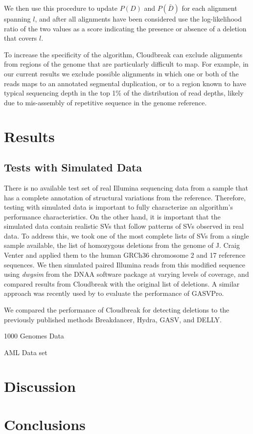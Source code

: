 \documentclass[12pt]{article}
\begin{document}
We then use this procedure to update $P(D)$ and $P(\bar{D})$ for each alignment spanning $l$, and after all alignments have been considered use the log-likelihood ratio of the two values as a score indicating the presence or absence of a deletion that covers $l$.

To increase the specificity of the algorithm, Cloudbreak can exclude alignments from regions of the genome that are particularly difficult to map. For example, in our current results we exclude possible alignments in which one or both of the reads maps to an annotated segmental duplication, or to a region known to have typical sequencing depth in the top 1\% of the distribution of read depths, likely due to mis-assembly of repetitive sequence in the genome reference. \cite{Pickrell:2011du}

\section{Results}\label{results}

\subsection{Tests with Simulated Data}

There is no available test set of real Illumina sequencing data from a sample that has a complete annotation of structural variations from the reference. Therefore, testing with simulated data is important to fully characterize an algorithm's performance characteristics. On the other hand, it is important that the simulated data contain realistic SVs that follow patterns of SVs observed in real data. To address this, we took one of the most complete lists of SVs from a single sample available, the list of homozygous deletions from the genome of J. Craig Venter \cite{Levy:2007fb} and applied them to the human GRCh36 chromosome 2 and 17 reference sequences. We then simulated paired Illumina reads from this modified sequence using \emph{dwgsim} from the DNAA software package at varying levels of coverage, and compared results from Cloudbreak with the original list of deletions. A similar approach was recently used by \cite{Sindi:2012kk} to evaluate the performance of GASVPro.

We compared the performance of Cloudbreak for detecting deletions to the previously published methods Breakdancer, \cite{Chen:2009p3} Hydra, \cite{Quinlan:2010gf} GASV, \cite{Sindi:2009gu} and DELLY. \cite{Rausch:2012he}

1000 Genomes Data

AML Data set

\section{Discussion}\label{discussion}



\section{Conclusions}\label{conclusions}





\end{document}
